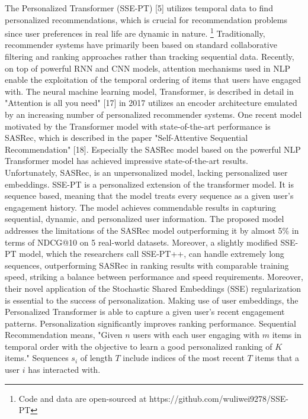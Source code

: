 The Personalized Transformer (SSE-PT) [5] utilizes temporal data to find personalized recommendations, which is crucial for recommendation problems since user preferences in real life are dynamic in nature. \footnote{Code and data are open-sourced at https://github.com/wuliwei9278/SSE-PT} Traditionally, recommender systems have primarily been based on standard collaborative filtering and ranking approaches rather than tracking sequential data. Recently, on top of powerful RNN and CNN models, attention mechanisms used in NLP enable the exploitation of the temporal ordering of items that users have engaged with. The neural machine learning model, Transformer, is described in detail in "Attention is all you need" [17] in 2017 utilizes an encoder architecture emulated by an increasing number of personalized recommender systems. One recent model motivated by the  Transformer model with state-of-the-art performance is SASRec, which is described in the paper "Self-Attentive Sequential Recommendation" [18]. Especially the SASRec model based on the powerful NLP Transformer model has achieved impressive state-of-the-art results. Unfortunately, SASRec, is an unpersonalized model, lacking personalized user embeddings. SSE-PT is a personalized extension of the transformer model. It is sequence based, meaning that the model treats every sequence  as a given user's engagement history. The model achieves commendable results in capturing sequential, dynamic, and personalized user information. The proposed model addresses the limitations of the SASRec model outperforming it by almost 5$\%$ in terms of NDCG@10 on 5 real-world datasets. Moreover, a slightly modified SSE-PT model, which the researchers call SSE-PT++, can handle extremely long sequences, outperforming SASRec in ranking results with comparable training speed, striking a balance between performance and speed requirements. Moreover, their novel application of the Stochastic Shared Embeddings (SSE) regularization is essential to the success of personalization. Making use of user embeddings, the Personalized Transformer is able to capture a given user's recent engagement patterns. Personalization significantly improves ranking performance.
Sequential Recommendation means, "Given $n$ users with each user engaging with $m$ items in temporal order with the objective to learn a good personalized ranking of $K$ items." Sequences $s_i$ of length $T$ include indices of the most recent $T$ items that a user $i$ has interacted with.

